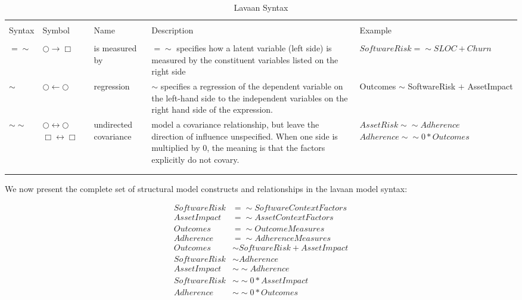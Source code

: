 \begin{table*}[!htbp] \centering 
	\caption{Lavaan Syntax} 
	\label{tab:model_lavaan_syntax} 
	\begin{small}
		\begin{tabular}{p{.75cm}p{1.25cm}p{1.5cm}p{3.5cm}p{2.5cm}} 
			&&&&\\[-1.8ex]\hline 
			\hline&&&& \\[-1.8ex] 
			Syntax & Symbol & Name & Description & Example \\ 
			\hline &&&&\\[-1.8ex]  
			$=\sim$	& $\bigcirc \rightarrow \Box$ & is measured by & $=\sim$ specifies how a latent variable (left side) is measured by the constituent variables listed on the right side & $SoftwareRisk =\sim SLOC + Churn$\\	
			 $\sim$ & $\bigcirc \leftarrow \bigcirc$ & regression & $\sim$ specifies a regression of the dependent variable on the left-hand side to the independent variables on the right hand side of the expression. & Outcomes $\sim$ SoftwareRisk $+$ AssetImpact  \\	
			 $\sim\sim$ & $\bigcirc \leftrightarrow \bigcirc$ $\Box \leftrightarrow \Box$ & undirected covariance & model a covariance relationship, but leave the direction of influence unspecified. When one side is multiplied by 0, the meaning is that the factors  explicitly do not covary. & $AssetRisk \sim\sim Adherence$  $Adherence \sim\sim 0*Outcomes$\\
			\hline &&&&\\[-1.8ex] 
			\hline &&&&\\[-1.8ex] 
		\end{tabular} 
	\end{small}
\end{table*} 
We now present the complete set of structural model constructs and relationships in the lavaan model syntax: 

 \begin{equation} \label{eq:1}
 \begin{split}
 SoftwareRisk &=\sim SoftwareContextFactors\\ 
  AssetImpact &=\sim AssetContextFactors\\
  Outcomes &=\sim OutcomeMeasures\\
  Adherence &=\sim AdherenceMeasures\\
  Outcomes &\sim SoftwareRisk + AssetImpact\\
   SoftwareRisk &\sim Adherence\\
   AssetImpact &\sim\sim  Adherence\\
   SoftwareRisk &\sim\sim 0*AssetImpact\\
   Adherence &\sim\sim 0*Outcomes\\
 \end{split}
 \end{equation}     